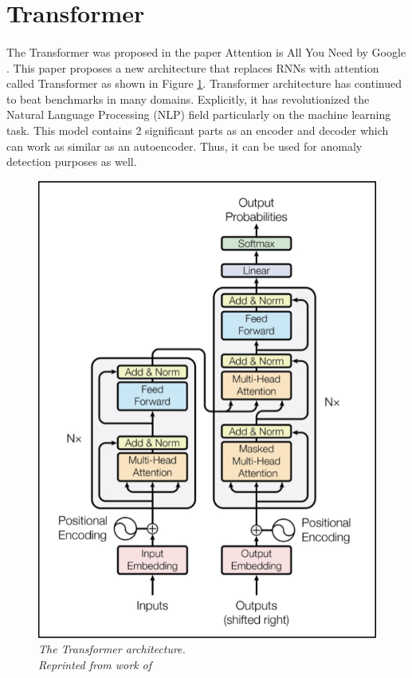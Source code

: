 \section{Transformer}
\paragraph{}
The Transformer was proposed in the paper Attention is All You Need by Google \cite{vaswani_shazeer_parmar_uszkoreit_jones_n_gomez_kaiser_polosukhin_2017}. This paper proposes a new architecture that replaces RNNs with attention called Transformer as shown in Figure \ref{fig:attention}. Transformer architecture has continued to beat benchmarks in many domains. Explicitly, it has revolutionized the Natural Language Processing (NLP) field particularly on the machine learning task. This model contains 2 significant parts as an encoder and decoder which can work as similar as an autoencoder. Thus, it can be used for anomaly detection purposes as well.

\begin{figure}[H]
  \centering
  \caption[The Transformer architecture.]{\emph{The Transformer architecture. \\Reprinted from work of \citeauthor{vaswani_shazeer_parmar_uszkoreit_jones_n_gomez_kaiser_polosukhin_2017} \citeyear{vaswani_shazeer_parmar_uszkoreit_jones_n_gomez_kaiser_polosukhin_2017}}}\label{fig:attention}
  \includegraphics[scale = 0.4
  ]{figures/attention.jpg}  
\end{figure}

